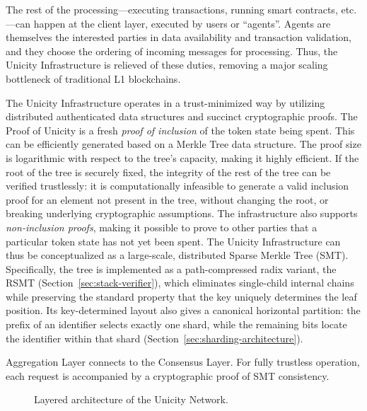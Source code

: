 \documentclass[twocolumn]{article}
\begin{document}
The rest of the processing---executing transactions, running smart contracts, etc.---can happen at the client layer, executed by users or ``agents''. Agents are themselves the interested parties in data availability and transaction validation, and they choose the ordering of incoming messages for processing. Thus, the Unicity Infrastructure is relieved of these duties, removing a major scaling bottleneck of traditional L1 blockchains.

The Unicity Infrastructure operates in a trust-minimized way by utilizing distributed authenticated data structures and succinct cryptographic proofs. The Proof of Unicity is a fresh \emph{proof of inclusion} of the token state being spent. This can be efficiently generated based on a Merkle Tree data structure. The proof size is logarithmic with respect to the tree's capacity, making it highly efficient. If the root of the tree is securely fixed, the integrity of the rest of the tree can be verified trustlessly: it is computationally infeasible to generate a valid inclusion proof for an element not present in the tree, without changing the root, or breaking underlying cryptographic assumptions. The infrastructure also supports \textit{non-inclusion proofs}, making it possible to prove to other parties that a particular token state has not yet been spent. The Unicity Infrastructure can thus be conceptualized as a large-scale, distributed Sparse Merkle Tree (SMT). Specifically, the tree is implemented as a path-compressed radix variant, the RSMT (Section~\ref{sec:stack-verifier}), which eliminates single-child internal chains while preserving the standard property that the key uniquely determines the leaf position. Its key-determined layout also gives a canonical horizontal partition: the prefix of an identifier selects exactly one shard, while the remaining bits locate the identifier within that shard (Section~\ref{sec:sharding-architecture}).

Aggregation Layer connects to the Consensus Layer. For fully trustless operation, each request is accompanied by a cryptographic proof of SMT consistency.

\begin{figure}[!htbp]
    \centering
    \caption{Layered architecture of the Unicity Network.}\label{fig:layers}
\end{figure}
\end{document}

